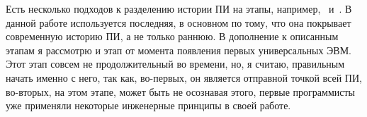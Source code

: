 Есть несколько подходов к разделению истории ПИ на этапы, например,~\cite{Glass} и~\cite{Aguila:2014:MSE}. В данной работе используется последняя, в основном по тому, что она покрывает современную историю ПИ, а не только раннюю. В дополнение к описанным этапам я рассмотрю и этап от момента появления первых универсальных ЭВМ. Этот этап совсем не продолжительный во времени, но, я считаю, правильным начать именно с него, так как, во-первых, он является отправной точкой всей ПИ, во-вторых, на этом этапе, может быть не осознавая этого, первые программисты уже применяли некоторые инженерные принципы в своей работе.
